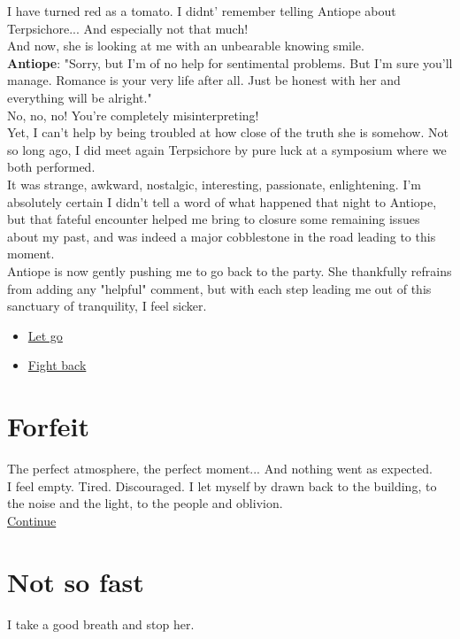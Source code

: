 \documentclass{report}
\newcommand{\speaker}[1]{
	\textbf{#1}: 
}
\newcommand{\glink}[2]{
	\hyperref[#1]{#2}
}
\newcommand{\gsection}[1]{
	\section*{#1}
	\label{#1}
}
\begin{document}
I have turned red as a tomato. I didnt' remember telling Antiope about Terpsichore... And especially not that much!\\

And now, she is looking at me with an unbearable knowing smile.\\

\speaker{Antiope} "Sorry, but I'm of no help for sentimental problems. But I'm sure you'll manage. Romance is your very life after all. Just be honest with her and everything will be alright."\\

No, no, no! You're completely misinterpreting!\\

Yet, I can't help by being troubled at how close of the truth she is somehow. Not so long ago, I did meet again Terpsichore by pure luck at a symposium where we both performed.\\

It was strange, awkward, nostalgic, interesting, passionate, enlightening. I'm absolutely certain I didn't tell a word of what happened that night to Antiope, but that fateful encounter helped me bring to closure some remaining issues about my past, and was indeed a major cobblestone in the road leading to this moment.\\

Antiope is now gently pushing me to go back to the party. She thankfully refrains from adding any "helpful" comment, but with each step leading me out of this sanctuary of tranquility, I feel sicker.\\

\begin{itemize}
	\item \glink{Forfeit}{Let go}
	\item \glink{Not so fast}{Fight back}
\end{itemize}

\gsection{Forfeit}

The perfect atmosphere, the perfect moment... And nothing went as expected.\\

I feel empty. Tired. Discouraged. I let myself by drawn back to the building, to the noise and the light, to the people and oblivion.\\

\glink{Masks}{Continue}

\gsection{Not so fast}

I take a good breath and stop her.\\
\end{document}
